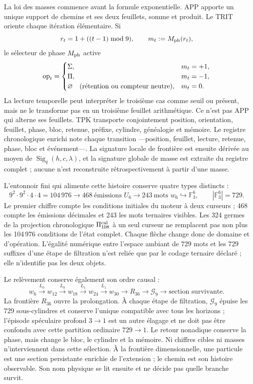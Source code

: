 La loi des masses commence avant la formule exponentielle. APP apporte un unique
support de chemins et ses deux feuillets, somme et produit. Le TRIT oriente chaque
itération élémentaire.
Si
\[
 r_t=1+((t-1)\bmod9),\qquad m_t:=M_{\rm ph}(r_t),
\]
le sélecteur de phase \(M_{\rm ph}\) active
\[
 \operatorname{op}_t=
 \begin{cases}
  \Sigma,&m_t=+1,\\
  \Pi,&m_t=-1,\\
  \varnothing\quad(\text{\rm rétention ou compteur neutre}),&m_t=0.
 \end{cases}
\]
La lecture temporelle peut interpréter le troisième cas comme seuil ou présent,
mais ne le transforme pas en un troisième feuillet arithmétique. Ce n'est pas APP qui alterne
ses feuillets. TPK transporte
conjointement position, orientation, feuillet, phase, bloc, retenue, préfixe,
cylindre, généalogie et mémoire. Le registre chronologique enrichi note
chaque transition ---position,
feuillet, lecture, retenue, phase, bloc et événement---. La signature locale de frontière
est ensuite dérivée au moyen de \(\operatorname{Sig}_q(h,c,\lambda)\), et la signature
globale de masse est extraite du registre complet ; aucune n'est reconstruite
rétrospectivement à partir d'une masse.

L'entonnoir fini qui alimente cette histoire conserve quatre types distincts :
\[
 9^2\!\cdot9^2\!\cdot4\!\cdot4=104\,976
 \longrightarrow 468\ \text{émissions }U_6
 \longrightarrow 243\ \text{mots }w_6
 \hookrightarrow \mathbb F_3^6,
 \qquad |\mathbb F_3^6|=729.
\]
Le premier chiffre compte les conditions initiales du moteur à deux curseurs ; 468
compte les émissions décimales et 243 les mots ternaires visibles. Les 324 germes
de la projection chronologique \(\Pi_{108}^{\rm cal}\) à un seul curseur
ne remplacent pas non plus les 104\,976
conditions de l'état complet. Chaque flèche change donc de domaine et
d'opération. L'égalité numérique entre l'espace ambiant de \(729\) mots et les
\(729\) suffixes d'une étape de filtration n'est reliée que par le codage
ternaire déclaré ; elle n'identifie pas les deux objets.

Le relèvement conserve également son ordre causal :
\[
 w_6\xrightarrow{\,L_0\,}w_{12}
 \xrightarrow{\,L_0\,}w_{18}
 \xrightarrow{\,L_1\,}w_{24}
 \xrightarrow{\,L_1\,}w_{30}
 \longrightarrow R_{36}\longrightarrow\mathcal G_9
 \longrightarrow
 \text{section survivante}.
\]
La frontière \(R_{36}\) ouvre la prolongation. À chaque étape de filtration,
\(\mathcal G_9\) épuise
les 729 sous-cylindres et conserve l'unique compatible avec tous les horizons ;
l'épisode spéculaire profond \(3\to1\) est un autre élagage et ne doit pas être confondu avec
cette partition ordinaire \(729\to1\). Le retour nonadique conserve la phase,
mais change le bloc, le cylindre et la mémoire. Ni chiffres cibles ni masses n'interviennent
dans cette sélection. À la frontière dimensionnelle, une particule est une section
persistante enrichie de l'extension ; le chemin est son histoire observable.
Son nom physique se lit ensuite et ne décide pas quelle branche survit.

